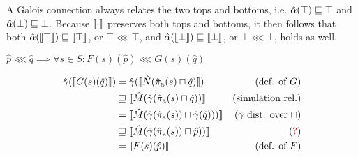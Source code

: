 A Galois connection always relates the two tops and bottoms, i.e. $\hat{\alpha}(\top) \sqsubseteq \top$ and $\hat{\alpha}(\bot) \sqsubseteq \bot$. Because $\llbracket \cdot \rrbracket$ preserves both tops and bottoms, it then follows that both $\hat{\alpha}(\llbracket \top \rrbracket) \sqsubseteq \llbracket \top \rrbracket$, or $\top \lll \top$, and $\hat{\alpha}(\llbracket \bot \rrbracket) \sqsubseteq \llbracket \bot \rrbracket$, or $\bot \lll \bot$, holds as well.



\begin{lemma} \label{lem:f-refine-g}
$\hat p \lll \hat q \implies \forall s \in S : F(s)(\hat p) \lll G(s)(\hat q)$
\end{lemma}

\begin{align*}
\hat{\gamma}(\llbracket G(s)(\hat q) \rrbracket)
  & =         \hat{\gamma}(\llbracket \hat N(\operatorname{\hat{\pi}_{\textrm{a}}}(s) \sqcap \hat q) \rrbracket)           & (\textrm{def. of } G) \\
  & \sqsupseteq \llbracket \hat M(\hat{\gamma}(\operatorname{\hat{\pi}_{\textrm{a}}}(s) \sqcap \hat q)) \rrbracket           & (\textrm{simulation rel.}) \\
  & =         \llbracket \hat M(\hat{\gamma}(\operatorname{\hat{\pi}_{\textrm{a}}}(s)) \sqcap \hat{\gamma}(\hat q))) \rrbracket & (\hat{\gamma} \textrm{ dist. over } \sqcap) \\
  & \sqsupseteq \llbracket \hat M(\hat{\gamma}(\operatorname{\hat{\pi}_{\textrm{a}}}(s)) \sqcap \hat p)) \rrbracket          & (\textrm{\textcolor{red}{?}}) \\
  & =         \llbracket F(s)(\hat p) \rrbracket                                            & (\textrm{def. of } F)
\end{align*}

